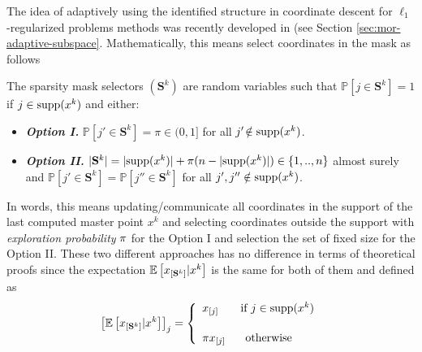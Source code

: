 The idea of adaptively using the identified structure in coordinate descent for $\ell_1$-regularized problems methods was recently developed in \cite{grishchenko2020proximal} (see Section \ref{sec:mor-adaptive-subspace}. Mathematically, this means select coordinates in the mask as follows
\begin{assumption}
\label{hyp:algoident}
The sparsity mask selectors $(\mathbf{S}^k)$ are random variables such that   $\mathbb{P}[j\in\mathbf{S}^k]=1$ if $j \in \mathrm{supp}({x^k})$ and either:
\begin{itemize}
    \item[] \textbf{\emph{Option I.}}
    $\mathbb{P}[j'\in\mathbf{S}^k] = \pi \in(0,1] $ for all $j'\!\notin \mathrm{supp}({x^k})$.
    \item[] \textbf{\emph{Option II.}}  $|\mathbf{S}^k| = |\mathrm{supp}({x^k})| + \pi(n - |\mathrm{supp}({x^k})|) \in \{ 1,..,n \} $ almost surely and  $\mathbb{P}[j'\in\mathbf{S}^k]=\mathbb{P}[j''\in\mathbf{S}^k]$ for all $j',j''\notin \mathrm{supp}({x^k})$.
\end{itemize}
\end{assumption}

In words, this means updating/communicate all coordinates in the support of the last computed master point $x^k$ and selecting coordinates outside the support with \emph{exploration probability} $\pi$ for the Option I and selection the set of fixed size for the Option II. These two different approaches has no difference in terms of theoretical proofs since the expectation $\mathbb{E}\left[x_{[\mathbf{S}^k]}|x^k\right]$ is the same for both of them and defined as
$$
\left[\EE\left[x_{[\mathbf{S}^k]}|x^k\right]\right]_j = \left\{\begin{array}{ll}
 x_{[j]}  \hspace*{-0.2cm}  &  \hspace*{0ex} \text{ if } j\in\supp(x^k)  \\[0.5cm]
\pi x_{[j]} & \hspace*{1ex}\text{ otherwise }
\end{array}
\right.
$$

